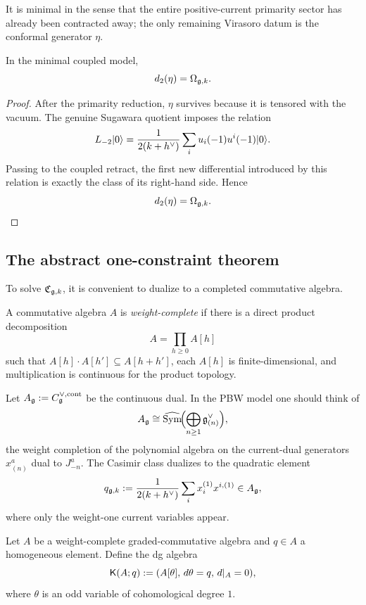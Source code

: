 It is minimal in the sense that the entire positive-current primarity sector has already been contracted away; the only remaining Virasoro datum is the conformal generator \(\eta\).

\begin{theorem}\label{thm:casimir-transgression}
In the minimal coupled model,
\[
d_2(\eta)=\Omega_{\mathfrak g,k}.
\]
\end{theorem}

\begin{proof}
After the primarity reduction, \(\eta\) survives because it is tensored with the vacuum. The genuine Sugawara quotient imposes the relation
\[
L_{-2}\lvert 0\rangle
=
\frac{1}{2(k+h^\vee)}
\sum_i u_i(-1)u^i(-1)\lvert 0\rangle.
\]
Passing to the coupled retract, the first new differential introduced by this relation is exactly the class of its right-hand side. Hence
\[
d_2(\eta)=\Omega_{\mathfrak g,k}.
\]
\end{proof}

\subsection{The abstract one-constraint theorem}

To solve \(\mathfrak C_{\mathfrak g,k}\), it is convenient to dualize to a completed commutative algebra.

\begin{definition}
A commutative algebra \(A\) is \emph{weight-complete} if there is a direct product decomposition
\[
A=\prod_{h\ge 0} A[h]
\]
such that \(A[h]\cdot A[h']\subseteq A[h+h']\), each \(A[h]\) is finite-dimensional, and multiplication is continuous for the product topology.
\end{definition}

Let \(A_{\mathfrak g}:=C_{\mathfrak g}^{\vee,\mathrm{cont}}\) be the continuous dual. In the PBW model one should think of
\[
A_{\mathfrak g}\cong \widehat{\operatorname{Sym}}\!\Bigl(\bigoplus_{n\ge 1} \mathfrak g^\vee_{(n)}\Bigr),
\]
the weight completion of the polynomial algebra on the current-dual generators \(x^a_{(n)}\) dual to \(J^a_{-n}\). The Casimir class dualizes to the quadratic element
\[
q_{\mathfrak g,k}:=\frac{1}{2(k+h^\vee)}\sum_i x_i^{(1)}x^{i,(1)} \in A_{\mathfrak g},
\]
where only the weight-one current variables appear.

\begin{definition}
Let \(A\) be a weight-complete graded-commutative algebra and \(q\in A\) a homogeneous element. Define the dg algebra
\[
\mathsf K(A;q):=(A[\theta],\,d\theta=q,\,d|_A=0),
\]
where \(\theta\) is an odd variable of cohomological degree \(1\).
\end{definition}

